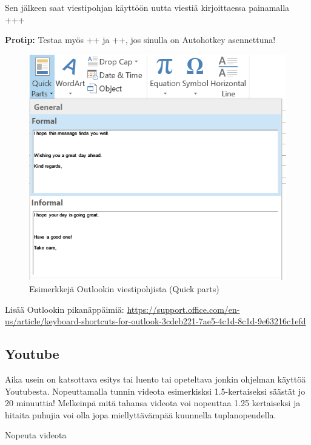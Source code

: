 \documentclass[a4paper,12pt]{scrartcl}
\begin{document}
Sen jälkeen saat viestipohjan käyttöön uutta viestiä kirjoittaessa painamalla \\ +++\keys{\return}

\textbf{Protip:} Testaa myös \keys{\ctrl}++ ja \keys{\ctrl}++, jos sinulla on Autohotkey asennettuna!

\begin{figure}[H]
	\includegraphics[width=\linewidth]{img/Quick_parts.png}
	\caption{Esimerkkejä Outlookin viestipohjista (Quick parts)}
	\label{fig:Quick_parts}
\end{figure}

\medskip

Lisää Outlookin pikanäppäimiä: \url{https://support.office.com/en-us/article/keyboard-shortcuts-for-outlook-3cdeb221-7ae5-4c1d-8c1d-9e63216c1efd}

\subsection{Youtube}

Aika usein on katsottava esitys tai luento tai opeteltava jonkin ohjelman käyttöä Youtubesta. Nopeuttamalla tunnin videota esimerkisksi 1.5-kertaiseksi säästät jo 20 minuuttia! Melkeinpä mitä tahansa videota voi nopeuttaa 1.25 kertaiseksi ja hitaita puhujia voi olla jopa miellyttävämpää kuunnella tuplanopeudella.

 Nopeuta videota
\end{document}
